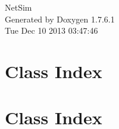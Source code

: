 \documentclass[a4paper]{book}
\begin{document}
\hypersetup{pageanchor=false,citecolor=blue}
\begin{titlepage}
\vspace*{7cm}
\begin{center}
{\Large \-Net\-Sim }\\
\vspace*{1cm}
{\large \-Generated by Doxygen 1.7.6.1}\\
\vspace*{0.5cm}
{\small Tue Dec 10 2013 03:47:46}\\
\end{center}
\end{titlepage}
\clearemptydoublepage
{}
\tableofcontents
\clearemptydoublepage
{}
\hypersetup{pageanchor=true,citecolor=blue}
\chapter{\-Class \-Index}

\chapter{\-Class \-Index}

\end{document}
